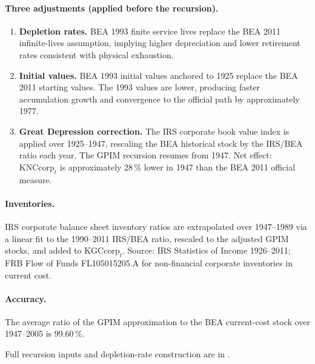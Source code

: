 \documentclass[11pt,a4paper]{article}
\begin{document}
\paragraph{Three adjustments (applied before the recursion).}

\begin{enumerate}
	\item \textbf{Depletion rates.} BEA 1993 finite service lives replace
	the BEA 2011 infinite-lives assumption, implying higher depreciation
	and lower retirement rates consistent with physical exhaustion.
	
	\item \textbf{Initial values.} BEA 1993 initial values anchored to
	1925 replace the BEA 2011 starting values. The 1993 values are lower,
	producing faster accumulation growth and convergence to the official
	path by approximately 1977.
	
	\item \textbf{Great Depression correction.} The IRS corporate book
	value index \citep[Series~V~115, pp.~924--926]{Census1975} is applied
	over 1925--1947, rescaling the BEA historical stock by the IRS/BEA
	ratio each year. The GPIM recursion resumes from 1947. Net effect:
	$\text{KNCcorp}_t$ is approximately 28\,\% lower in 1947 than the BEA
	2011 official measure.
\end{enumerate}

\paragraph{Inventories.}
IRS corporate balance sheet inventory ratios are extrapolated over
1947--1989 via a linear fit to the 1990--2011 IRS/BEA ratio, rescaled to
the adjusted GPIM stocks, and added to $\text{KGCcorp}_t$. Source:
IRS Statistics of Income 1926--2011; FRB Flow of Funds FL105015205.A for
non-financial corporate inventories in current cost.

\paragraph{Accuracy.}
The average ratio of the GPIM approximation to the BEA current-cost stock
over 1947--2005 is 99.60\,\%.

\noindent Full recursion inputs and depletion-rate construction are in
\citet[Appendix~6.7, Section~V; Appendix Table~6.8.II.3]{Shaikh2016}.

\end{document}
